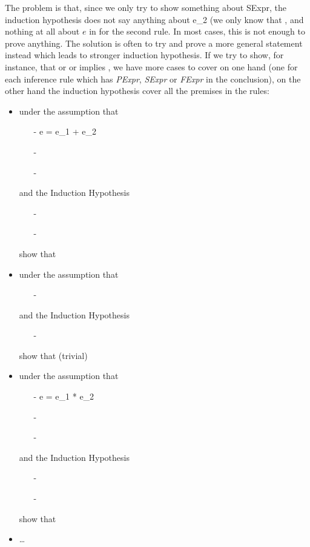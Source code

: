 \documentclass{book}
\begin{document}
The problem is that, since we only try to show something about
\<SExpr\>, the induction hypothesis does not say anything about \<e_2\> (we
only know that \<\>, and nothing at all about $e$ in for the
second rule. In most cases, this is not enough to prove anything. The
solution is often to try and prove a more general statement instead which
leads to stronger induction hypothesis. If we try to show, for instance, that 
\<\> or \<\> or \<\> implies \<\>,
we have more cases to cover on one hand (one for each inference rule which has
\textit{PExpr}, \textit{SExpr} or \textit{FExpr} in the conclusion), on the other hand the induction
hypothesis cover all the premises in the rules:
\begin{itemize}
\item under the assumption that
\begin{itemize}
 \item[-] \<e = e_1 + e_2\>
 \item[-] \<\>
 \item[-] \<\>
 \end{itemize}
 and the Induction Hypothesis 
\begin{itemize}
  \item[-]  \<\>
  \item[-]  \<\>
  \end{itemize}
  show that   \<\>
\item under the assumption that
  \begin{itemize}
  \item[-] \<\>
  \end{itemize}
 and the Induction Hypothesis 
 \begin{itemize}
 \item[-]  \<\>
 \end{itemize}
 show that \<\> (trivial)
\item under the assumption that
\begin{itemize}
 \item[-] \<e = e_1 * e_2\>
 \item[-] \<\>
 \item[-] \<\>
 \end{itemize}
 and the Induction Hypothesis 
\begin{itemize}
  \item[-]  \<\>
  \item[-]  \<\>
  \end{itemize}
  show that   \<\>
  
\item \ldots
\end{itemize} 
\end{document}
